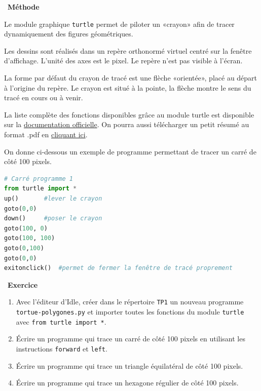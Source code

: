 \documentclass[
  11pt,
]{article}
\newcommand{\passthrough}[1]{#1}
\providecommand{\tightlist}{%
  \setlength{\itemsep}{0pt}\setlength{\parskip}{0pt}}
\newcounter{exo}
\newenvironment{exercice}[1]
{\par \medskip   \addtocounter{exo}{1} \noindent  
\begin{bclogo}[arrondi =0.1,   noborder = true, logo=\bccrayon, marge=4]{~\textbf{Exercice} \textbf{\theexo} {\itshape #1} }  \par}
{
\end{bclogo}
 \par \bigskip }
\newcounter{prop}
\newcounter{def}
\newcounter{cours}
\newcounter{prog}
\newenvironment{methode}[1]
{\par \medskip    \noindent  
 \begin {bclogo}[arrondi =0.1,logo=\bcoutil, marge=4,noborder = true] {~\textbf{Méthode}   {\itshape #1} }  \par}
{
\end{bclogo}
 \par \bigskip }
\begin{document}
\begin{methode}{}

Le module graphique \passthrough{\lstinline!turtle!} permet de piloter
un «crayon» afin de tracer dynamiquement des figures géométriques.

Les dessins sont réalisés dans un repère orthonormé virtuel centré sur
la fenêtre d'affichage. L'unité des axes est le pixel. Le repère n'est
pas visible à l'écran.

La forme par défaut du crayon de tracé est une flèche «orientée», placé
au départ à l'origine du repère. Le crayon est situé à la pointe, la
flèche montre le sens du tracé en cours ou à venir.

La liste complète des fonctions disponibles grâce au module turtle est
disponible sur la
\href{http://www.frederic-junier.org/PythonSeconde/Python_Seconde_Parc/tortue/doc/turtleDoc.html}{documentation
officielle}. On pourra aussi télécharger un petit résumé au format .pdf
en
\href{http://www.frederic-junier.org/PythonSeconde/Python_Seconde_Parc/fichiers_python_2nde/Resume_Turtle.pdf}{cliquant
ici}.

On donne ci-dessous un exemple de programme permettant de tracer un
carré de côté 100 pixels.

\begin{lstlisting}[language=Python]
# Carré programme 1
from turtle import *
up()       #lever le crayon
goto(0,0)
down()     #poser le crayon
goto(100, 0)
goto(100, 100)
goto(0,100)
goto(0,0)
exitonclick()  #permet de fermer la fenêtre de tracé proprement
\end{lstlisting}

\end{methode}

\begin{exercice}{}

\begin{enumerate}
\def\labelenumi{\arabic{enumi}.}
\tightlist
\item
  Avec l'éditeur d'Idle, créer dans le répertoire
  \passthrough{\lstinline!TP1!} un nouveau programme
  \passthrough{\lstinline!tortue-polygones.py!} et importer toutes les
  fonctions du module \passthrough{\lstinline!turtle!} avec
  \passthrough{\lstinline!from turtle import *!}.
\item
  Écrire un programme qui trace un carré de côté 100 pixels en utilisant
  les instructions \passthrough{\lstinline!forward!} et
  \passthrough{\lstinline!left!}.
\item
  Écrire un programme qui trace un triangle équilatéral de côté 100
  pixels.
\item
  Écrire un programme qui trace un hexagone régulier de côté 100 pixels.
\end{enumerate}

\end{exercice}
\end{document}
